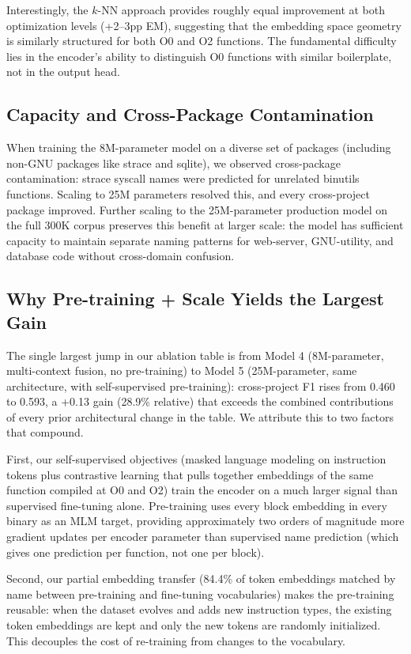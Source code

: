 \documentclass[sigconf,nonacm]{acmart}
\begin{document}
Interestingly, the $k$-NN approach provides roughly equal improvement at both optimization levels (+2--3pp EM), suggesting that the embedding space geometry is similarly structured for both O0 and O2 functions. The fundamental difficulty lies in the encoder's ability to distinguish O0 functions with similar boilerplate, not in the output head.

\subsection{Capacity and Cross-Package Contamination}

When training the 8M-parameter model on a diverse set of packages (including non-GNU packages like strace and sqlite), we observed cross-package contamination: strace syscall names were predicted for unrelated binutils functions. Scaling to 25M parameters resolved this, and every cross-project package improved. Further scaling to the 25M-parameter production model on the full 300K corpus preserves this benefit at larger scale: the model has sufficient capacity to maintain separate naming patterns for web-server, GNU-utility, and database code without cross-domain confusion.

\subsection{Why Pre-training + Scale Yields the Largest Gain}
\label{sec:pretrain-discussion}

The single largest jump in our ablation table is from Model 4 (8M-parameter, multi-context fusion, no pre-training) to Model 5 (25M-parameter, same architecture, with self-supervised pre-training): cross-project F1 rises from 0.460 to 0.593, a +0.13 gain (28.9\% relative) that exceeds the combined contributions of every prior architectural change in the table. We attribute this to two factors that compound.

First, our self-supervised objectives (masked language modeling on instruction tokens plus contrastive learning that pulls together embeddings of the same function compiled at O0 and O2) train the encoder on a much larger signal than supervised fine-tuning alone. Pre-training uses every block embedding in every binary as an MLM target, providing approximately two orders of magnitude more gradient updates per encoder parameter than supervised name prediction (which gives one prediction per function, not one per block).

Second, our partial embedding transfer (84.4\% of token embeddings matched by name between pre-training and fine-tuning vocabularies) makes the pre-training reusable: when the dataset evolves and adds new instruction types, the existing token embeddings are kept and only the new tokens are randomly initialized. This decouples the cost of re-training from changes to the vocabulary.
\end{document}
